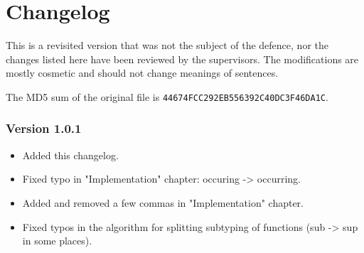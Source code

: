 \chapter*{Changelog}

This is a revisited version that was not the subject of the defence, nor the
changes listed here have been reviewed by the supervisors. The modifications
are mostly cosmetic and should not change meanings of sentences.

The MD5 sum of the original file is \texttt{44674FCC292EB556392C40DC3F46DA1C}.

\subsection*{Version 1.0.1}

\begin{itemize}
\item Added this changelog.
\item Fixed typo in "Implementation" chapter: occuring -> occurring.
\item Added and removed a few commas in "Implementation" chapter. 
\item Fixed typos in the algorithm for splitting subtyping of functions
  (sub -> sup in some places).
\end{itemize}